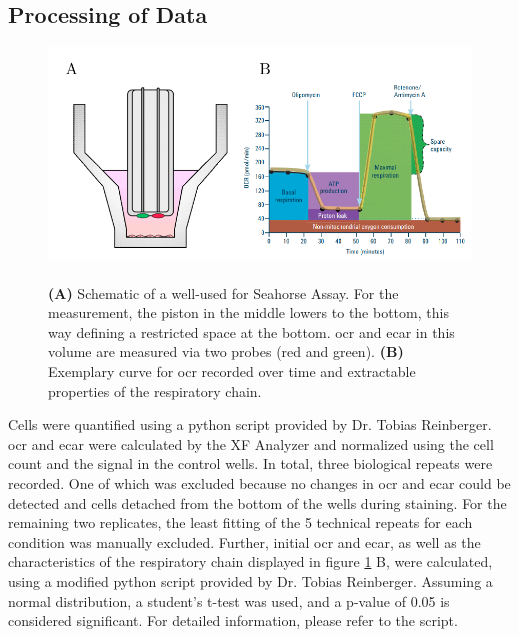     \subsection{Processing of Data}
    \begin{figure}[h]
    \capstart
        \centering
        \includegraphics{Abbildung/seahorse_basics_placeholder.pdf}

        \begin{minipage}{\captionwidth}
            \caption[enrichment]{\\
            \textbf{(A)} Schematic of a well-used for Seahorse Assay. For the measurement, the piston in the middle lowers to the bottom, this way defining a restricted space at the bottom. \ac{ocr} and \ac{ecar} in this volume are measured via two probes (red and green). \textbf{(B)} Exemplary curve for \ac{ocr} recorded over time and extractable properties of the respiratory chain.}
            \label{fig:seahorse_basics}
        \end{minipage}
    \end{figure}

    Cells were quantified using a python script provided by Dr. Tobias Reinberger. \ac{ocr} and \ac{ecar} were calculated by the XF Analyzer and normalized using the cell count and the signal in the control wells. In total, three biological repeats were recorded. One of which was excluded because no changes in \ac{ocr} and \ac{ecar} could be detected and cells detached from the bottom of the wells during staining. For the remaining two replicates, the least fitting of the 5 technical repeats for each condition was manually excluded. Further, initial \ac{ocr} and \ac{ecar}, as well as the characteristics of the respiratory chain displayed in figure \ref{fig:seahorse_basics} B, were calculated, using a modified python script provided by Dr. Tobias Reinberger. Assuming a normal distribution, a student's t-test was used, and a p-value of 0.05 is considered significant. For detailed information, please refer to the script.


